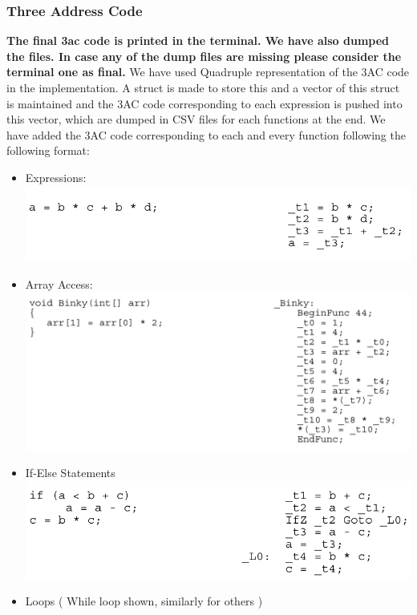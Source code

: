\documentclass[12pt]{article}
\begin{document}
    \subsubsection*{Three Address Code}
    \textbf{The final 3ac code is printed in the terminal. We have also dumped the files. In case any of the dump files are missing please consider the terminal one as final.} We have used Quadruple representation of the 3AC code in the implementation. A struct is made to store this and a vector of this struct is maintained and the 3AC code corresponding to each expression is pushed into this vector, which are  dumped in CSV files for each functions at the end.
    We have added the 3AC code corresponding to each and every function following the following format:
    \begin{itemize}
        \item Expressions: \\
        \includegraphics[scale = 0.4]{expr.png}
        \item Array Access: \\
        \includegraphics[scale = 0.4]{array.png}
        \item If-Else Statements \\
        \includegraphics[scale = 0.4]{ifelse.png}
        \item Loops ( While loop shown, similarly for others ) \\

\end{itemize}
\end{document}

